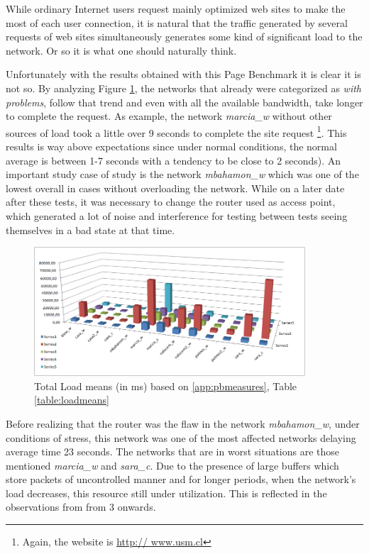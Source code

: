 While ordinary Internet users request mainly optimized  web sites to make the
most of each user connection, it is natural that the traffic generated by
several requests of web sites simultaneously generates some kind of significant
load to the network. Or so it is what one should naturally think.

Unfortunately with the results obtained with this Page Benchmark it is 
clear it is not so. By analyzing Figure \ref{fig:loadmeans}, the
networks that already were categorized as \emph{with problems}, follow that
trend and even with all the available bandwidth, take longer to complete the
request. As example, the network \emph{marcia\_w} without other sources of
load took a little over 9 seconds to complete the site request \footnote
{Again, the website is \url{http:// www.usm.cl}}. This results is way above
expectations since under normal conditions, the normal average is between 1-7
seconds with a tendency to be close to 2 seconds). An important study case of
study is the network \emph{mbahamon\_w} which was one of the lowest overall
in cases without overloading the network. While on a later date after these
tests, it was necessary to change the router used as access point, which
generated a lot of noise and interference for testing between tests seeing
themselves in a bad state at that time.

\begin{figure}[ht]
\centering
    \includegraphics[width=0.9\textwidth]{img/measures_page}
\caption[Page Benchmark: Total Load Means]{ Total Load means (in ms) based on \ref{app:pbmeasures}, Table \ref{table:loadmeans}}
\label{fig:loadmeans}
\end{figure}%

Before realizing that the router was the flaw in the network
\emph{mbahamon\_w}, under conditions of stress, this network was one of the
most affected networks delaying average time 23 seconds. The networks that are
in worst situations are those mentioned \emph{marcia\_w} and
\emph{sara\_c}. Due to the presence of large buffers which store packets of
uncontrolled manner and for longer periods, when the network's load decreases,
this resource  still under utilization. This is reflected in the observations
from from 3 onwards.

